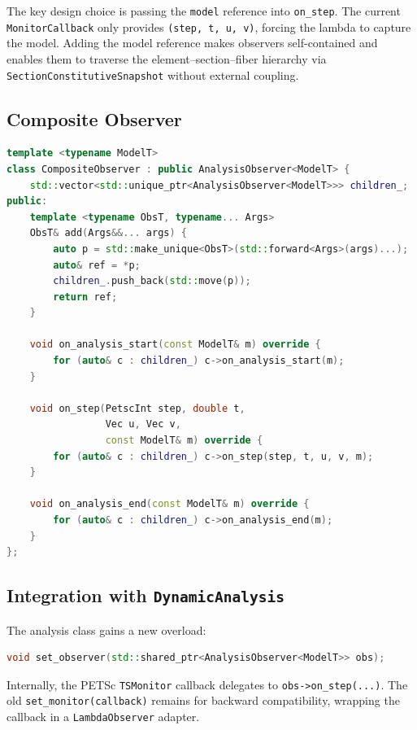 The key design choice is passing the \texttt{model} reference into
\texttt{on\_step}.  The current \texttt{MonitorCallback} only provides
\texttt{(step, t, u, v)}, forcing the lambda to capture the model.
Adding the model reference makes observers self-contained and enables
them to traverse the element--section--fiber hierarchy via
\texttt{SectionConstitutiveSnapshot} without external coupling.

\subsection{Composite Observer}

\begin{lstlisting}[language=C++,basicstyle=\ttfamily\small]
template <typename ModelT>
class CompositeObserver : public AnalysisObserver<ModelT> {
    std::vector<std::unique_ptr<AnalysisObserver<ModelT>>> children_;
public:
    template <typename ObsT, typename... Args>
    ObsT& add(Args&&... args) {
        auto p = std::make_unique<ObsT>(std::forward<Args>(args)...);
        auto& ref = *p;
        children_.push_back(std::move(p));
        return ref;
    }

    void on_analysis_start(const ModelT& m) override {
        for (auto& c : children_) c->on_analysis_start(m);
    }

    void on_step(PetscInt step, double t,
                 Vec u, Vec v,
                 const ModelT& m) override {
        for (auto& c : children_) c->on_step(step, t, u, v, m);
    }

    void on_analysis_end(const ModelT& m) override {
        for (auto& c : children_) c->on_analysis_end(m);
    }
};
\end{lstlisting}

\subsection{Integration with \texttt{DynamicAnalysis}}

The analysis class gains a new overload:
\begin{lstlisting}[language=C++,basicstyle=\ttfamily\small]
void set_observer(std::shared_ptr<AnalysisObserver<ModelT>> obs);
\end{lstlisting}
Internally, the PETSc \texttt{TSMonitor} callback delegates to
\texttt{obs->on\_step(...)}.  The old \texttt{set\_monitor(callback)}
remains for backward compatibility, wrapping the callback in a
\texttt{LambdaObserver} adapter.

